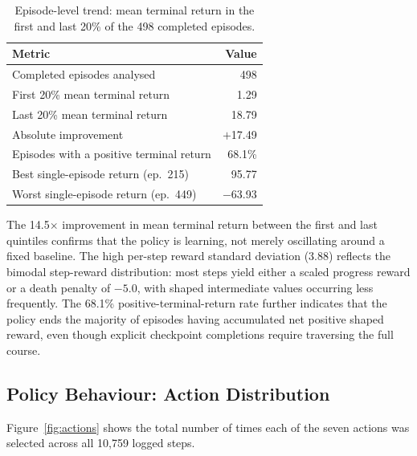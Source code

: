 \documentclass[11pt]{article}
\begin{document}
\begin{table}[htbp]
  \centering
  \caption{Episode-level trend: mean terminal return in the first and
    last 20\% of the 498 completed episodes.}
  \label{tab:trend}
  \begin{tabular}{lr}
    \toprule
    Metric & Value \\
    \midrule
    Completed episodes analysed              & 498 \\
    First 20\% mean terminal return          & 1.29 \\
    Last 20\% mean terminal return           & 18.79 \\
    Absolute improvement                     & $+$17.49 \\
    Episodes with a positive terminal return & 68.1\% \\
    Best single-episode return (ep.\ 215)    & 95.77 \\
    Worst single-episode return (ep.\ 449)   & $-$63.93 \\
    \bottomrule
  \end{tabular}
\end{table}

The 14.5$\times$ improvement in mean terminal return between the first
and last quintiles confirms that the policy is learning, not merely
oscillating around a fixed baseline. The high per-step reward standard
deviation (3.88) reflects the bimodal step-reward distribution:
most steps yield either a scaled progress reward or a death penalty of
$-5.0$, with shaped intermediate values occurring less frequently.
The 68.1\% positive-terminal-return rate further indicates that the
policy ends the majority of episodes having accumulated net positive
shaped reward, even though explicit checkpoint completions require
traversing the full course.

\subsection{Policy Behaviour: Action Distribution}

Figure~\ref{fig:actions} shows the total number of times each of the
seven actions was selected across all 10{,}759 logged steps.
\end{document}
